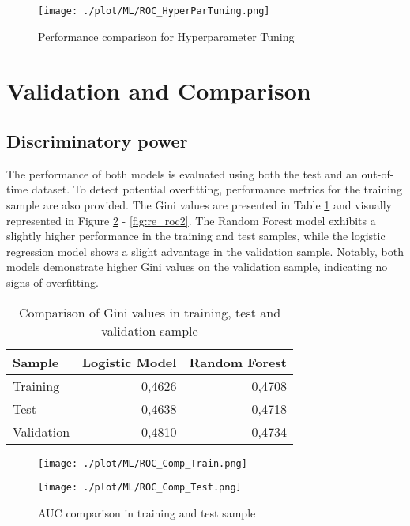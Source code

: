 \begin{figure}[H]
	\centering
	\texttt{[image: ./plot/ML/ROC\_HyperParTuning.png]}
    \caption{Performance comparison for Hyperparameter Tuning}
    \label{fig:re_rochp}
\end{figure}

\section{Validation and Comparison}
\label{sec:comp_model}

\subsection{Discriminatory power}
The performance of both models is evaluated using both the test and an out-of-time dataset. To detect potential overfitting, performance metrics for the training sample are also provided. The Gini values are presented in Table \ref{re_ginicomp} and visually represented in Figure \ref{fig:re_roc1} - \ref{fig:re_roc2}. The Random Forest model exhibits a slightly higher performance in the training and test samples, while the logistic regression model shows a slight advantage in the validation sample. Notably, both models demonstrate higher Gini values on the validation sample, indicating no signs of overfitting.

\begin{table}[H]
\centering
\begin{tabular}{lrr}\toprule
\textbf{Sample} & \textbf{Logistic Model} & \textbf{Random Forest} \\\midrule
Training        & 0,4626                  & 0,4708                 \\
Test            & 0,4638                  & 0,4718                 \\
Validation      & 0,4810                  & 0,4734                \\\bottomrule
\end{tabular}
\caption{Comparison of Gini values in training, test and validation sample}
\label{re_ginicomp}
\end{table}

\begin{figure}[H]
\begin{minipage}{.5\textwidth}
	\centering
	\texttt{[image: ./plot/ML/ROC\_Comp\_Train.png]}
\end{minipage}%
\begin{minipage}{.5\textwidth}
	\centering
	\texttt{[image: ./plot/ML/ROC\_Comp\_Test.png]}
\end{minipage}
    \caption{AUC comparison in training and test sample}
    \label{fig:re_roc1}
\end{figure}

